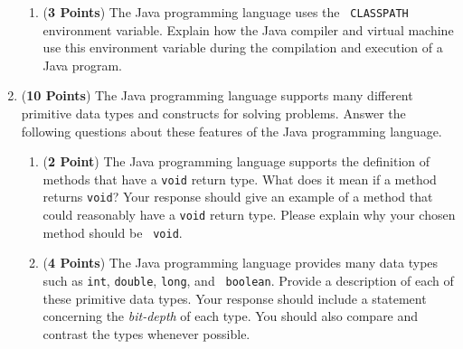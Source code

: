 \documentclass[12pt]{article}
\begin{document}
\begin{enumerate}
\begin{enumerate}

\item ({\bf 3 Points}) The Java programming language uses the {\tt
  CLASSPATH} environment variable.  Explain how the Java compiler and
  virtual machine use this environment variable during the compilation
  and execution of a Java program.

\end{enumerate}

\newpage

\item ({\bf 10 Points}) The Java programming language supports many
  different primitive data types and constructs for solving problems.
  Answer the following questions about these features of the Java
  programming language.

\begin{enumerate}

\item ({\bf 2 Point}) The Java programming language supports the
  definition of methods that have a {\tt void} return type.  What does
  it mean if a method returns {\tt void}?  Your response should give
  an example of a method that could reasonably have a {\tt void}
  return type.  Please explain why your chosen method should be {\tt
    void}.

  
\item ({\bf 4 Points}) The Java programming language provides many
  data types such as {\tt int}, {\tt double}, {\tt long}, and {\tt
    boolean}.  Provide a description of each of these primitive data
  types.  Your response should include a statement concerning the {\em
    bit-depth} of each type. You should also compare and contrast the
  types whenever possible.



\end{enumerate}
\end{enumerate}
\end{document}
